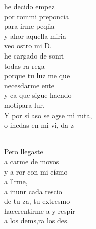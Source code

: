 \documentclass[12pt]{article}
\begin{document}
\begin{multicols*}{2}
\begin{cancion}
	he decido empez\\
	por rommi preponcia \\
	para irme peqña\\
	y ahor aquella miria\\
	veo ostro mi D. \\
	 he cargado de sonri \\
	todas ra rega\\
	porque tu luz me que \\
	necesdarme ente \\
	y ca que sigue haendo \\
	motipara lur. \\
	Y por si aso se agse mi ruta,\\
	o incdas en mi vi, da z\\\jump\\
	\begin{chorus}%
	Pero llegaste   \\
	a carme de movos\\
	y a ror con mi eísmo\\
	a llrme, \\
	a inunr cada rescio\\
	de tu za, tu extresmo \\
	hacerentirme a y respir \\
	a los dems,ra los des. \\
	\end{chorus}%
	\jump\\
\end{cancion}%


\end{multicols*}
\end{document}
